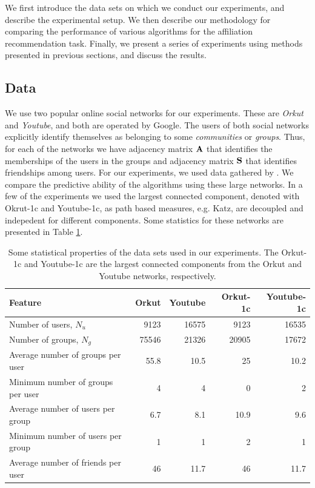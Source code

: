 We first introduce the data sets on which we conduct our experiments, and describe the experimental setup. We then describe our methodology for comparing the performance of various algorithms for the affiliation recommendation task. 
Finally, we present a series of experiments using methods presented in previous sections, and discuss the results. 

\subsection{Data}
We use two popular online social networks  for our experiments. These are \textit{Orkut} and \textit{Youtube}, and both are operated by Google. The users of both social networks explicitly identify themselves as belonging to some \textit{communities} or \textit{groups}. Thus, for each of the networks we have adjacency matrix $\mathbf{A}$ that identifies the memberships of the users in the groups and adjacency matrix $\mathbf{S}$ that identifies friendships among users. For our experiments, we used data gathered by \cite{Mislove}. We compare the predictive ability of the algorithms using these large networks. In a few of the experiments we used the largest connected component, denoted with Okrut-1c and Youtube-1c, as path based measures, e.g. \textsf{Katz}, are decoupled and indepedent for different components. Some statistics for these networks are presented in Table \ref{tab:datasets}.

\begin{table}[ht!]
\centering
\begin{tabular}{| l | r | r | r | r |} \hline
Feature & Orkut & Youtube & Orkut-1c & Youtube-1c\\ \hline
Number of users, $N_{u}$ & 9123 & 16575 & 9123 & 16535\\ \hline
Number of groups, $N_{g}$ & 75546 & 21326 & 20905 & 17672\\ \hline
Average number of groups per user & 55.8 & 10.5 & 25 & 10.2\\ \hline
Minimum number of groups per user & 4 & 4 & 0 & 2\\ \hline
Average number of users per group & 6.7 & 8.1 & 10.9 & 9.6\\ \hline
Minimum number of users per group & 1 & 1 & 2 & 1\\ \hline
Average number of friends per user & 46 & 11.7 & 46 & 11.7\\ \hline
\end{tabular}
\caption{Some statistical properties of the data sets used in our experiments. The Orkut-1c and Youtube-1c are the largest connected components from the Orkut and Youtube networks, respectively.}
\label{tab:datasets}
\end{table}

